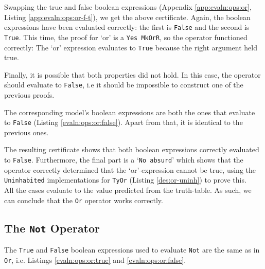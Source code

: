         
        Swapping the true and false boolean expressions (Appendix \ref{app:evaln:ops:or}, Listing \ref{app:evaln:ops:or-f-t}), we get the above certificate. Again, the boolean expressions have been evaluated correctly: the first is \texttt{False} and the second is \texttt{True}. This time, the proof for `or' is a \texttt{Yes MkOrR}, so the operator functioned correctly: The `or' expression evaluates to \texttt{True} because the right argument held true.
        
        
        
        Finally, it is possible that both properties did not hold. In this case, the operator should evaluate to \texttt{False}, i.e it should be impossible to construct one of the previous proofs.
        
        
        The corresponding \Idris model's boolean expressions are both the ones that evaluate to \texttt{False} (Listing \ref{evaln:ops:or:false}). Apart from that, it is identical to the previous ones.
        
        \newpage
        
        
        The resulting certificate shows that both boolean expressions correctly evaluated to \texttt{False}. Furthermore, the final part is a `\texttt{No absurd}' which shows that the operator correctly determined that the `or'-expression cannot be true, using the \texttt{Uninhabited} implementations for \texttt{TyOr} (Listing \ref{des:or-uninh}) to prove this.
        \\
        
        All the cases evaluate to the value predicted from the truth-table. As such, we can conclude that the \texttt{Or} operator works correctly.
    
    \subsection{The \texttt{Not} Operator}\label{evaln:ops:not}
        The \texttt{True} and \texttt{False} boolean expressions used to evaluate \texttt{Not} are the same as in \texttt{Or}, i.e. Listings \ref{evaln:ops:or:true} and \ref{evaln:ops:or:false}.
        \\
        
